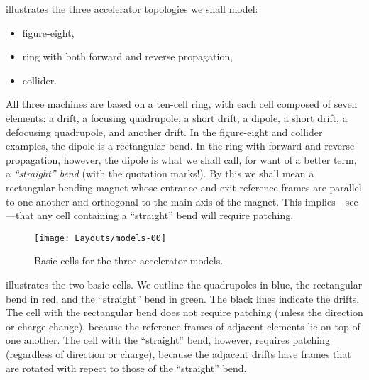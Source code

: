 %
 illustrates the three accelerator topologies
we shall model:
\begin{itemize}
  \item figure-eight,
  \item ring with both forward and reverse propagation,
  \item collider.
\end{itemize}
All three machines are based on a ten-cell ring, with each cell
composed of seven elements: a drift, a focusing quadrupole, a short
drift, a dipole, a short drift, a defocusing quadrupole, and another
drift.%
In the figure-eight and collider examples, the dipole is a rectangular
bend. In the ring with forward and reverse propagation, however, the
dipole is what we shall call, for want of a better term, a
\emph{``straight'' bend} (with the quotation marks!). By this we shall
mean a rectangular bending magnet whose entrance and exit reference
frames are parallel to one another and orthogonal to the main axis of
the magnet. This implies---see ---that any cell
containing a ``straight'' bend will require patching.

\begin{figure}[htb]\forceversofloat
  \centering
  \texttt{[image: Layouts/models-00]}
  \caption{Basic cells for the three accelerator models.}
  \label{fig:basic.cells}
\end{figure}

 illustrates the two basic cells. We outline
the quadrupoles in blue, the rectangular bend in red, and the
``straight'' bend in green. The black lines indicate the drifts.
The cell with the rectangular bend does not require patching (unless
the direction or charge change), because the reference frames of
adjacent elements lie on top of one another. The cell with the
``straight'' bend, however, requires patching (regardless of
direction or charge), because the adjacent drifts have frames that
are rotated with repect to those of the ``straight'' bend.

